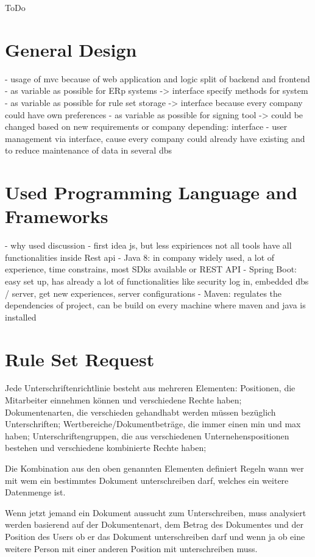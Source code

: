 ToDo

\section{General Design}
- usage of mvc because of web application and logic split of backend and frontend
- as variable as possible for ERp systems -> interface specify methods for system
- as variable as possible for rule set storage -> interface because every company could have own preferences
- as variable as possible for signing tool -> could be changed based on new requirements or company depending: interface
- user management via interface, cause every company could already have existing and to reduce maintenance of data in several dbs 

\section{Used Programming Language and Frameworks}
- why used discussion
- first idea js, but less expiriences not all tools have all functionalities inside Rest api
- Java 8: in company widely used, a lot of experience, time constrains, most SDks available or REST API
- Spring Boot: easy set up, has already a lot of functionalities like security log in, embedded dbs / server, get new experiences, server configurations
- Maven: regulates the dependencies of project, can be build on every machine where maven and java is installed

\section{Rule Set Request}
Jede Unterschriftenrichtlinie besteht aus mehreren Elementen: Positionen, die Mitarbeiter einnehmen können und verschiedene Rechte haben; Dokumentenarten, die verschieden gehandhabt werden müssen bezüglich Unterschriften; Wertbereiche/Dokumentbeträge, die immer einen min und max haben; Unterschriftengruppen, die aus verschiedenen Unternehenspositionen bestehen und verschiedene kombinierte Rechte haben;

Die Kombination aus den oben genannten Elementen definiert Regeln wann wer mit wem ein bestimmtes Dokument unterschreiben darf, welches ein weitere Datenmenge ist.

Wenn jetzt jemand ein Dokument aussucht zum Unterschreiben, muss analysiert werden basierend auf der Dokumentenart, dem Betrag des Dokumentes und der Position des Users ob er das Dokument unterschreiben darf und wenn ja ob eine weitere Person mit einer anderen Position mit unterschreiben muss.